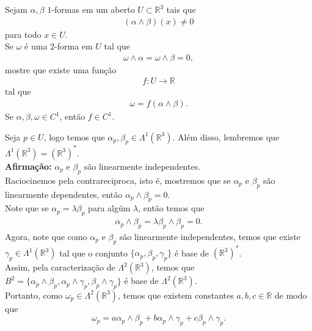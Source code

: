 \begin{homeworkProblem}[Seção 1-2]
  Sejam $\alpha,\beta$ $1$-formas em um aberto $U\subset\mathbb{R}^{3}$ tais que
  \begin{align*}
    (\alpha\wedge\beta)(x)\neq 0   
  \end{align*}
  para todo $x\in U$.\\
  Se $\omega$ é uma $2$-forma em $U$ tal que
  \begin{align*}
    \omega\wedge\alpha=\omega\wedge\beta=0,
  \end{align*}
  mostre que existe uma função
  \begin{align*}
    f:U\longrightarrow\mathbb{R}
  \end{align*}
  tal que
  \begin{align*}
    \omega=f(\alpha\wedge\beta).
  \end{align*}
  Se $\alpha,\beta,\omega\in C^{1}$, então $f\in C^{1}$.
  \begin{solution}
    Seja $p\in U$, logo temos que $\alpha_p,\beta_p\in\Lambda^{1}(\mathbb{R}^{3})$. Além disso, lembremos que $\Lambda^{1}(\mathbb{R}^{3})=(\mathbb{R}^{3})^{\ast}$.\\
    \textbf{Afirmação:} $\alpha_p$ e $\beta_p$ são linearmente independentes.\\
    Raciocinemos pela contrareciproca, isto é, mostremos que se $\alpha_p$ e $\beta_p$ são linearmente dependentes, então $\alpha_p\wedge\beta_p=0$.\\
    Note que se $\alpha_p=\lambda\beta_p$ para algúm $\lambda$, então temos que 
    \begin{align*}
      \alpha_p\wedge\beta_p=\lambda\beta_p\wedge\beta_p=0.
    \end{align*}
    Agora, note que como $\alpha_p$ e $\beta_p$ são linearmente independentes, temos que existe $\gamma_p\in\Lambda^{1}(\mathbb{R}^{3})$ tal que o conjunto $\{\alpha_p,\beta_p,\gamma_p\}$ é base de $(\mathbb{R}^{3})^{\ast}$.\\
    Assim, pela caracterização de $\Lambda^{2}(\mathbb{R}^{3})$, temos que $B^{2}=\{\alpha_p\wedge\beta_p,\alpha_p\wedge\gamma_p,\beta_p\wedge\gamma_p\}$ é base de $\Lambda^{2}(\mathbb{R}^{3})$.\\
    Portanto, como $\omega_p\in\Lambda^{2}(\mathbb{R}^{3})$, temos que existem constantes $a,b,c\in\mathbb{R}$ de modo que
    \begin{equation}\label{eq:2}
      \omega_p=a\alpha_p\wedge\beta_p+b\alpha_p\wedge\gamma_p+c\beta_p\wedge\gamma_p.
    \end{equation}

\end{solution}
\end{homeworkProblem}
